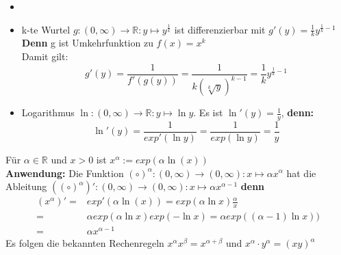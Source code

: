 \begin{Beispiel}{
	\begin{itemize}
		\item[]
		\item k-te Wurtel $g: (0,\infty) \rightarrow \mathbb{R} : 
		y \mapsto y^{\frac{1}{k}}$ ist differenzierbar mit 
		$g'(y) = \frac{1}{k}y^{\frac{1}{k}-1}$
		\textbf{Denn} g ist Umkehrfunktion zu $f(x) = x^k$ \\
		Damit gilt: 
		\begin{equation*}g'(y) = \frac{1}{f'(g(y))} = \frac{1}{k(\sqrt[k]{y})^{k-1}}
		= \frac{1}{k}y^{\frac{1}{k} -1}
		\end{equation*}
		\item Logarithmus $\ln: (0,\infty) \rightarrow \mathbb{R}: 
		y \mapsto \ln y$. Es ist 
		$\ln'(y) = \frac{1}{y}$, \textbf{denn:}
		\begin{equation*}\ln'(y) = \frac{1}{exp'(\ln y)}
		= \frac{1}{exp(\ln y)} = \frac{1}{y}
		\end{equation*}
	\end{itemize}
}\end{Beispiel}

\begin{Bemerkung}{
	Für $\alpha \in \mathbb{R}$ und $x > 0$ ist $x^\alpha := exp(\alpha \ln(x))$ \\
	\textbf{Anwendung:} Die Funktion $\left( \circ \right)^\alpha : 
	(0, \infty) \rightarrow (0, \infty): x \mapsto \alpha x^{\alpha}$ hat die Ableitung 
	$((\circ)^{\alpha})' : (0, \infty) \rightarrow (0, \infty) : 
	x \mapsto \alpha x^{\alpha-1}$
	\textbf{denn} 
	\begin{align*}
	(x^{\alpha})' = & exp'(\alpha \ln(x)) = exp(\alpha\ln x) \frac{\alpha}{x} \\
	= & \alpha exp(\alpha \ln x) exp (-\ln x) =  \alpha exp ((\alpha -1 ) \ln x)) \\
	= & \alpha x^{\alpha-1}
	\end{align*}
	Es folgen die bekannten Rechenregeln $x^{\alpha}x^{\beta} = x^{\alpha+\beta} $
	und $x^\alpha \cdot y^\alpha = (xy)^\alpha$
}\end{Bemerkung}
\cleardoublepage
